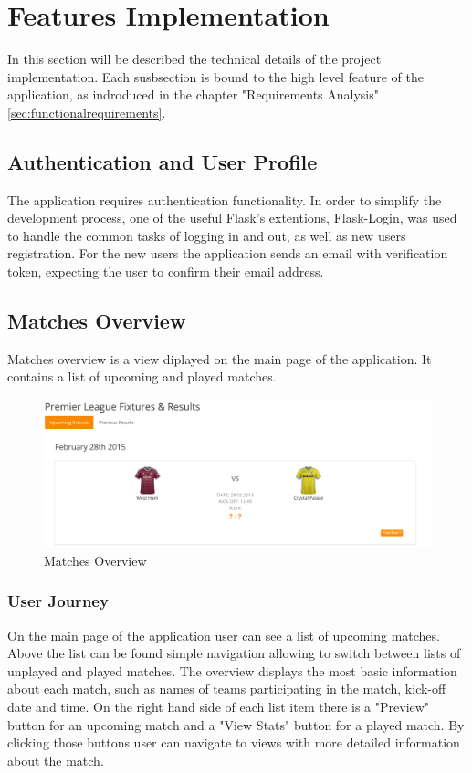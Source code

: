 \section{Features Implementation}
In this section will be described the technical details of the project implementation. Each susbsection is bound to the high level feature of the application, as indroduced in the chapter "Requirements Analysis" \ref{sec:functionalrequirements}.

\subsection{Authentication and User Profile}

The application requires authentication functionality. In order to simplify the development process, one of the useful Flask's extentions, Flask-Login, was used to handle the common tasks of logging in and out, as well as new users registration. For the new users the application sends an email with verification token, expecting the user to confirm their email address. 

\subsection{Matches Overview}
Matches overview is a view diplayed on the main page of the application. It contains a list of upcoming and played matches.

\begin{figure}[H]
	\begin{center}
		\includegraphics[width=.90\linewidth,natwidth=610,natheight=642]{impl/images/matchesOverviewExample}
		\caption{Matches Overview} \label{fig:using:matchesoverview}
	\end{center}
\end{figure}

\subsubsection{User Journey}
On the main page of the application user can see a list of upcoming matches. Above the list can be found simple navigation allowing to switch between lists of unplayed and played matches. The overview displays the most basic information about each match, such as names of teams participating in the match, kick-off date and time. On the right hand side of each list item there is a "Preview" button for an upcoming match and a "View Stats" button for a played match. By clicking those buttons user can navigate to views with more detailed information about the match. 


